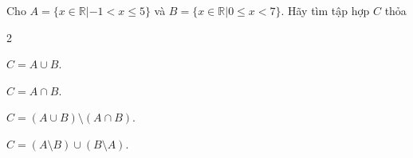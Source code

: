 \begin{bt}%
	Cho $ A=\{x \in \mathbb{R} | -1<x\le 5\}  $ và $ B=\{x \in \mathbb{R} | 0 \le x <7\} $. Hãy tìm tập hợp $ C $ thỏa
	\begin{enumEX}{2}
		\item $ C=A \cup  B $.
		\item $ C=A\cap B $. 
		\item $ C= (A\cup  B) \setminus (A \cap B) $.
		\item $ C=(A \setminus B) \cup (B  \setminus A) $.
	\end{enumEX}
	\loigiai{ 
		Ta  có $ A=(-1;5] $ và $ B=[0;7) $, từ đó suy ra
		\begin{enumEX}{2}
			 \item $ C=(-1;7) $.
			\item $  C=[0;5] $.
			\item  $ C=(-1;0) \cup(5;7) $.
			\item $  C=(-1;0) \cup(5;7) $.
		\end{enumEX}
	} 
\end{bt}

